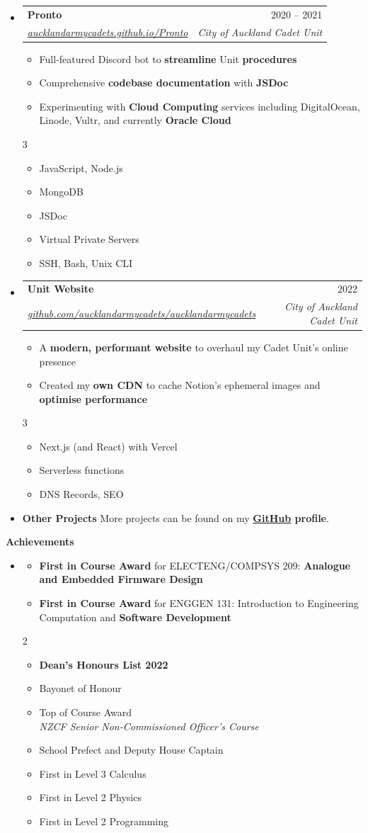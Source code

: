 \documentclass[11pt,a4paper]{article}[leftmargin=*]
\makeatletter
\def \entryspacing {-0pt}
\def \bulletstylei {\faAngleRight\hspace{-4.5pt}}
\def \bulletstyleii {\faCaretRight\hspace{-4.5pt}}
\renewcommand{\section}[2]{\vspace{5pt}
  \colorbox{secondary}{\color{white}\raggedbottom\normalsize\textbf{{#1}{\hspace{2pt}#2\hspace{4pt}}}}
}
\newcommand{\resumeEntryStart}{\begin{itemize}[leftmargin=2.5mm]}
\newcommand{\resumeEntryEnd}{\end{itemize}\vspace{\entryspacing}}
\newcommand{\resumeItemListStart}{\begin{itemize}[leftmargin=4.5mm]}
\newcommand{\resumeItemListEnd}{\end{itemize}}
\newcommand{\resumeItemListStartColumns}[2][-0.5]{\vspace*{#1\multicolsep}
\begin{multicols}{#2}\begin{itemize}[leftmargin=4.5mm]}
\newcommand{\resumeItemListEndColumns}[1][-1]{\end{itemize}\end{multicols}\vspace*{#1\multicolsep}}
\newcommand{\resumeItem}[2][\bulletstylei]{
  \item[\small#1]\small{
    {#2 \vspace{-2pt}}
  }
}
\newcommand{\resumeEntryTSDL}[4]{
  \vspace{-1pt}\item[]
    \begin{tabularx}{0.97\textwidth}{X@{\hspace{60pt}}r}
      \textbf{\color{primary}#1} & {\firabook\color{accent}\small#2} \\
      \textit{\color{accent}\small#3} & \textit{\color{accent}\small#4} \\
    \end{tabularx}\vspace{-6pt}
}
\newcommand{\resumeEntryS}[2]{
  \item[]\small{
    \textbf{\color{primary}#1 }{ #2 \vspace{-4pt}}
  }
}
\newcommand{\resumeIt}[1]{\textit{\color{accent}#1}}
\newcommand{\resumeBf}[1]{\small\textbf{\color{halfbold}#1}}
\makeatother
\begin{document}
\resumeEntryStart
\resumeEntryTSDL
{Pronto}{2020 -- 2021}
{\href{https://aucklandarmycadets.github.io/Pronto/}{aucklandarmycadets.github.io/Pronto}}{City of Auckland Cadet Unit}
\resumeItemListStart
\resumeItem {Full-featured Discord bot to \resumeBf{streamline} Unit \resumeBf{procedures}}
\resumeItem {Comprehensive \resumeBf{codebase documentation} with \resumeBf{JSDoc}}
\resumeItem {Experimenting with \resumeBf{Cloud Computing} services including DigitalOcean, Linode, Vultr, and currently \resumeBf{Oracle Cloud}}
\resumeItemListEnd
\resumeItemListStartColumns{3}
\resumeItem[\bulletstyleii] {JavaScript, Node.js}
\resumeItem[\bulletstyleii] {MongoDB}
\resumeItem[\bulletstyleii] {JSDoc}
\resumeItem[\bulletstyleii] {Virtual Private Servers}
\resumeItem[\bulletstyleii] {SSH, Bash, Unix CLI}
\resumeItemListEndColumns
\resumeEntryEnd

\resumeEntryStart
\resumeEntryTSDL
{Unit Website}{2022}
{\href{https://github.com/aucklandarmycadets/aucklandarmycadets}{github.com/aucklandarmycadets/aucklandarmycadets}}{City of Auckland Cadet Unit}
\resumeItemListStart
\resumeItem {A \resumeBf{modern, performant website} to overhaul my Cadet Unit's online presence}
\resumeItem {Created my \resumeBf{own CDN} to cache Notion's ephemeral images and \resumeBf{optimise performance}}
\resumeItemListEnd
\resumeItemListStartColumns{3}
\resumeItem[\bulletstyleii] {Next.js (and React) with Vercel}
\resumeItem[\bulletstyleii] {Serverless functions}
\resumeItem[\bulletstyleii] {DNS Records, SEO}
\resumeItemListEndColumns
\resumeEntryEnd

\resumeEntryStart
\resumeEntryS
{Other Projects}{More projects can be found on my \resumeBf{\href{https://github.com/jamesnzl}{GitHub} profile}.}
\resumeEntryEnd


\section{\faTrophy}{Achievements}

\resumeEntryStart
\item[]
\resumeItemListStart
\resumeItem {\resumeBf{First in Course Award} for ELECTENG/COMPSYS 209: \resumeBf{Analogue and Embedded Firmware Design}}
\resumeItem {\resumeBf{First in Course Award} for ENGGEN 131: Introduction to Engineering Computation and \resumeBf{Software Development}}
\resumeItemListEnd

\resumeItemListStartColumns{2}
\resumeItem {\resumeBf{Dean's Honours List 2022}}
\resumeItem {Bayonet of Honour}
\resumeItem {Top of Course Award\\\resumeIt{NZCF Senior Non-Commissioned Officer's Course}}
\resumeItem {School Prefect and Deputy House Captain}
\resumeItem {First in Level 3 Calculus}
\resumeItem {First in Level 2 Physics}
\resumeItem {First in Level 2 Programming}
\resumeItemListEndColumns
\resumeEntryEnd
\end{document}
